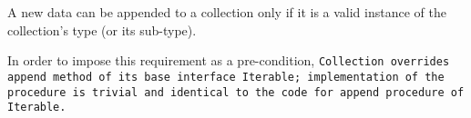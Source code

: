 A new data can be appended to a collection only if it is a
valid instance of the collection's type (or its sub-type).

In order to impose this requirement as a pre-condition, \tt{Collection}
overrides \tt{append} method of its base interface \tt{Iterable};
implementation of the procedure is trivial and identical
to the code for \tt{append} procedure of \tt{Iterable}.


\noindent{}


\noindent{}

